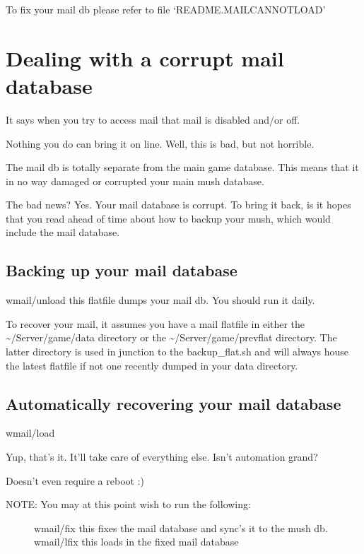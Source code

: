 \documentclass[letterpaper,10pt,english]{sphinxmanual}
\begin{document}
\sphinxAtStartPar
To fix your mail db please refer to file ‘README.MAILCANNOTLOAD’


\chapter{Dealing with a corrupt mail database}
\label{\detokenize{28-maildbcorrupt:dealing-with-a-corrupt-mail-database}}\label{\detokenize{28-maildbcorrupt::doc}}
\sphinxAtStartPar
It says when you try to access mail that mail is disabled and/or off.

\sphinxAtStartPar
Nothing you do can bring it on line.  Well, this is bad, but not horrible.

\sphinxAtStartPar
The mail db is totally separate from the main game database.  This means
that it in no way damaged or corrupted your main mush database.

\sphinxAtStartPar
The bad news?  Yes.  Your mail database is corrupt.  To bring it back,
is it hopes that you read ahead of time about how to backup your mush,
which would include the mail database.


\section{Backing up your mail database}
\label{\detokenize{28-maildbcorrupt:backing-up-your-mail-database}}
\sphinxAtStartPar
wmail/unload \textendash{} this flatfile dumps your mail db.  You should run it daily.

\sphinxAtStartPar
To recover your mail, it assumes you have a mail flatfile in either the
\textasciitilde{}/Server/game/data directory or the \textasciitilde{}/Server/game/prevflat directory.  The
latter directory is used in junction to the backup\_flat.sh and will always
house the latest flatfile if not one recently dumped in your data directory.


\section{Automatically recovering your mail database}
\label{\detokenize{28-maildbcorrupt:automatically-recovering-your-mail-database}}
\sphinxAtStartPar
wmail/load

\sphinxAtStartPar
Yup, that’s it.  It’ll take care of everything else.  Isn’t automation grand?

\sphinxAtStartPar
Doesn’t even require a reboot :)
\begin{description}
\item[{NOTE:  You may at this point wish to run the following:}] \leavevmode
\sphinxAtStartPar
wmail/fix  \textendash{} this fixes the mail database and sync’s it to the mush db.
wmail/lfix \textendash{} this loads in the fixed mail database

\end{description}
\end{document}
